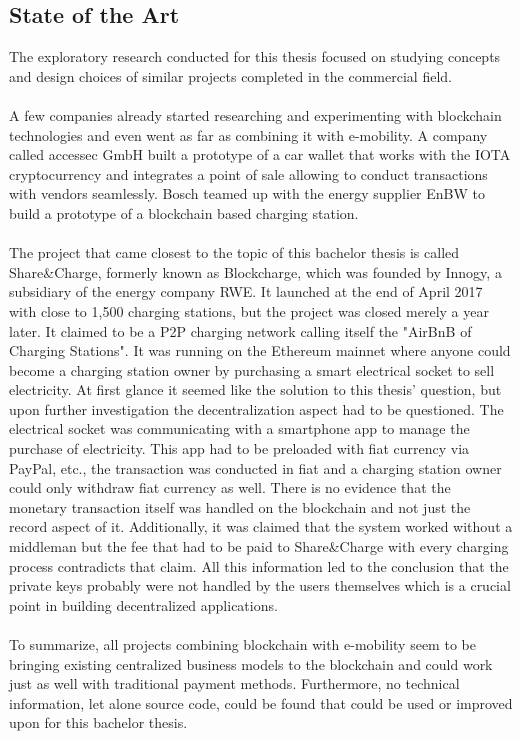 \subsection{State of the Art}
The exploratory research conducted for this thesis focused on studying concepts and design choices of similar projects completed in the commercial field.
\\\\
A few companies already started researching and experimenting with blockchain technologies and even went as far as combining it with e-mobility.
A company called accessec GmbH built a prototype of a car wallet that works with the IOTA cryptocurrency and integrates a point of sale allowing to conduct transactions with vendors seamlessly\cite{car-wallet}.
Bosch teamed up with the energy supplier EnBW to build a prototype of a blockchain based charging station\cite{bosch-dlt}.
\\\\
The project that came closest to the topic of this bachelor thesis is called Share\&Charge, formerly known as Blockcharge\cite{share-charge}\cite{blockcharge}, which was founded by Innogy, a subsidiary of the energy company RWE\cite{innogy}.
It launched at the end of April 2017 with close to 1,500 charging stations, but the project was closed merely a year later\cite{share-charge-closed}.
It claimed to be a P2P charging network calling itself the "AirBnB of Charging Stations".
It was running on the Ethereum mainnet where anyone could become a charging station owner by purchasing a smart electrical socket to sell electricity.
At first glance it seemed like the solution to this thesis' question, but upon further investigation the decentralization aspect had to be questioned.
The electrical socket was communicating with a smartphone app to manage the purchase of electricity.
This app had to be preloaded with fiat currency via PayPal, etc., the transaction was conducted in fiat and a charging station owner could only withdraw fiat currency as well.
There is no evidence that the monetary transaction itself was handled on the blockchain and not just the record aspect of it.
Additionally, it was claimed that the system worked without a middleman but the fee that had to be paid to Share\&Charge with every charging process contradicts that claim.
All this information led to the conclusion that the private keys probably were not handled by the users themselves which is a crucial point in building decentralized applications.
\\\\
To summarize, all projects combining blockchain with e-mobility seem to be bringing existing centralized business models to the blockchain and could work just as well with traditional payment methods.
Furthermore, no technical information, let alone source code, could be found that could be used or improved upon for this bachelor thesis.
